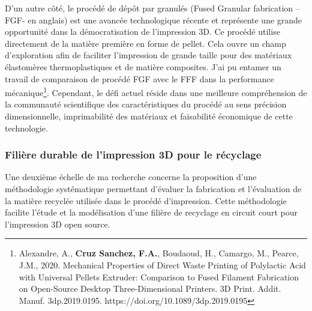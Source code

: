 \documentclass[
  11pt,
]{article}
\begin{document}
D'un autre côté, le procédé de dépôt par granulés (Fused Granular
fabrication --FGF- en anglais) est une avancée technologique récente et
représente une grande opportunité dans la démocratisation de
l'impression 3D. Ce procédé utilise directement de la matière première
en forme de pellet. Cela ouvre un champ d'exploration afin de faciliter
l'impression de grande taille pour des matériaux élastomères
thermoplastiques et de matière composites. J'ai pu entamer un travail de
comparaison de procédé FGF avec le FFF dans la performance
mécanique\footnote{Alexandre, A., \textbf{Cruz Sanchez, F.A.}, Boudaoud,
  H., Camargo, M., Pearce, J.M., 2020. Mechanical Properties of Direct
  Waste Printing of Polylactic Acid with Universal Pellets Extruder:
  Comparison to Fused Filament Fabrication on Open-Source Desktop
  Three-Dimensional Printers. 3D Print. Addit. Manuf. 3dp.2019.0195.
  https://doi.org/10.1089/3dp.2019.0195}. Cependant, le défi actuel
réside dans une meilleure compréhension de la communauté scientifique
des caractéristiques du procédé au sens précision dimensionnelle,
imprimabilité des matériaux et faisabilité économique de cette
technologie.

\hypertarget{filiuxe8re-durable-de-limpression-3d-pour-le-ruxe9cyclage}{%
\subsubsection{Filière durable de l'impression 3D pour le
récyclage}\label{filiuxe8re-durable-de-limpression-3d-pour-le-ruxe9cyclage}}

Une deuxième échelle de ma recherche concerne la proposition d'une
méthodologie systématique permettant d'évaluer la fabrication et
l'évaluation de la matière recyclée utilisée dans le procédé
d'impression. Cette méthodologie facilite l'étude et la modélisation
d'une filière de recyclage en circuit court pour l'impression 3D open
source.
\end{document}
